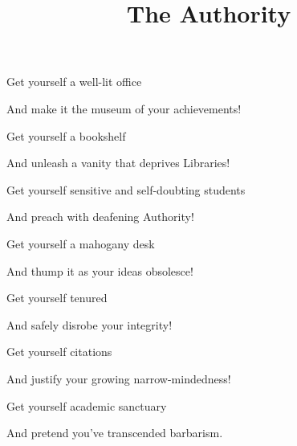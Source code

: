 \documentclass{article}
\title{The Authority}
\begin{document}
 \newline

Get yourself a well-lit office \newline

And make it the museum of your achievements!\newline\newline

Get yourself a bookshelf\newline

And unleash a vanity that deprives Libraries!\newline\newline

Get yourself sensitive and self-doubting students\newline

And preach with deafening Authority!\newline\newline

Get yourself a mahogany desk\newline

And thump it as your ideas obsolesce!\newline\newline

Get yourself tenured\newline

And safely disrobe your integrity!\newline\newline

Get yourself citations\newline

And justify your growing narrow-mindedness!\newline\newline

Get yourself academic sanctuary\newline

And pretend you've transcended barbarism.\newline\newline
\end{document}
